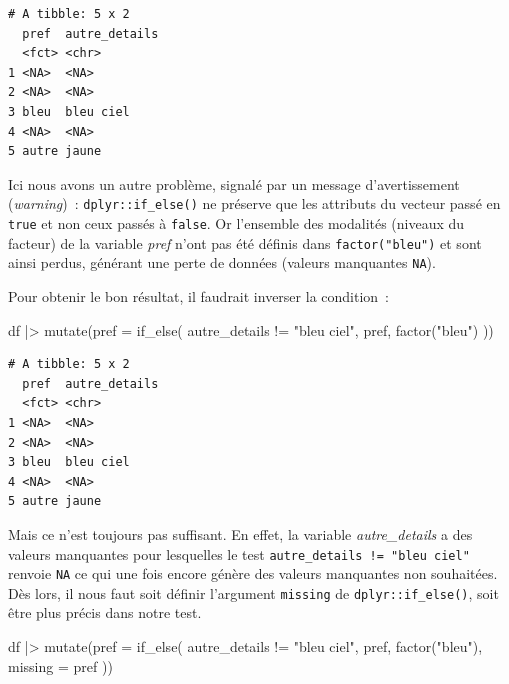\documentclass[
  letterpaper,
  DIV=11,
  numbers=noendperiod,
  oneside]{scrreprt}
\newenvironment{Shaded}{\begin{snugshade}}{\end{snugshade}}
\newcommand{\AttributeTok}[1]{\textcolor[rgb]{0.40,0.45,0.13}{#1}}
\newcommand{\FunctionTok}[1]{\textcolor[rgb]{0.28,0.35,0.67}{#1}}
\newcommand{\NormalTok}[1]{\textcolor[rgb]{0.00,0.23,0.31}{#1}}
\newcommand{\SpecialCharTok}[1]{\textcolor[rgb]{0.37,0.37,0.37}{#1}}
\newcommand{\StringTok}[1]{\textcolor[rgb]{0.13,0.47,0.30}{#1}}
\begin{document}
\begin{verbatim}
# A tibble: 5 x 2
  pref  autre_details
  <fct> <chr>        
1 <NA>  <NA>         
2 <NA>  <NA>         
3 bleu  bleu ciel    
4 <NA>  <NA>         
5 autre jaune        
\end{verbatim}

Ici nous avons un autre problème, signalé par un message d'avertissement
(\emph{warning})~: \texttt{dplyr::if\_else()} ne préserve que les
attributs du vecteur passé en \texttt{true} et non ceux passés à
\texttt{false}. Or l'ensemble des modalités (niveaux du facteur) de la
variable \emph{pref} n'ont pas été définis dans \texttt{factor("bleu")}
et sont ainsi perdus, générant une perte de données (valeurs manquantes
\texttt{NA}).

Pour obtenir le bon résultat, il faudrait inverser la condition~:

\begin{Shaded}
\begin{Highlighting}[]
\NormalTok{df }\SpecialCharTok{|\textgreater{}} 
  \FunctionTok{mutate}\NormalTok{(}\AttributeTok{pref =} \FunctionTok{if\_else}\NormalTok{(}
\NormalTok{    autre\_details }\SpecialCharTok{!=} \StringTok{"bleu ciel"}\NormalTok{, }
\NormalTok{    pref, }
    \FunctionTok{factor}\NormalTok{(}\StringTok{"bleu"}\NormalTok{)}
\NormalTok{  ))}
\end{Highlighting}
\end{Shaded}

\begin{verbatim}
# A tibble: 5 x 2
  pref  autre_details
  <fct> <chr>        
1 <NA>  <NA>         
2 <NA>  <NA>         
3 bleu  bleu ciel    
4 <NA>  <NA>         
5 autre jaune        
\end{verbatim}

Mais ce n'est toujours pas suffisant. En effet, la variable
\emph{autre\_details} a des valeurs manquantes pour lesquelles le test
\texttt{autre\_details\ !=\ "bleu\ ciel"} renvoie \texttt{NA} ce qui une
fois encore génère des valeurs manquantes non souhaitées. Dès lors, il
nous faut soit définir l'argument \texttt{missing} de
\texttt{dplyr::if\_else()}, soit être plus précis dans notre test.

\begin{Shaded}
\begin{Highlighting}[]
\NormalTok{df }\SpecialCharTok{|\textgreater{}} 
  \FunctionTok{mutate}\NormalTok{(}\AttributeTok{pref =} \FunctionTok{if\_else}\NormalTok{(}
\NormalTok{    autre\_details }\SpecialCharTok{!=} \StringTok{"bleu ciel"}\NormalTok{, }
\NormalTok{    pref, }
    \FunctionTok{factor}\NormalTok{(}\StringTok{"bleu"}\NormalTok{),}
    \AttributeTok{missing =}\NormalTok{ pref}
\NormalTok{  ))}
\end{Highlighting}
\end{Shaded}
\end{document}
